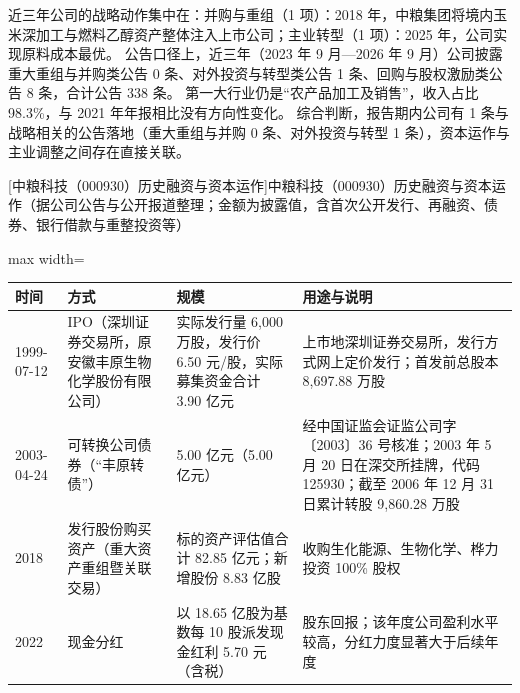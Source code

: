  近三年公司的战略动作集中在：并购与重组（1 项）：2018 年，中粮集团将境内玉米深加工与燃料乙醇资产整体注入上市公司；主业转型（1 项）：2025 年，公司实现原料成本最优。 公告口径上，近三年（2023 年 9 月---2026 年 9 月）公司披露重大重组与并购类公告 0 条、对外投资与转型类公告 1 条、回购与股权激励类公告 8 条，合计公告 338 条。 第一大行业仍是“农产品加工及销售”，收入占比 98.3\%，与 2021 年年报相比没有方向性变化。 综合判断，报告期内公司有 1 条与战略相关的公告落地（重大重组与并购 0 条、对外投资与转型 1 条），资本运作与主业调整之间存在直接关联。

\begin{center}\small\setlength{\tabcolsep}{4pt}
[中粮科技（000930）历史融资与资本运作]{中粮科技（000930）历史融资与资本运作（据公司公告与公开报道整理；金额为披露值，含首次公开发行、再融资、债券、银行借款与重整投资等）}
\begin{adjustbox}{max width=\textwidth}
\begin{tabular}{@{}p{1.45cm}p{2.55cm}p{4.05cm}p{4.95cm}@{}}
\toprule
时间 & 方式 & 规模 & 用途与说明 \\
\midrule
1999-07-12 & IPO（深圳证券交易所，原安徽丰原生物化学股份有限公司） & 实际发行量 6,\allowbreak{}000 万股，\allowbreak{}发行价 6.50 元/\allowbreak{}股，\allowbreak{}实际募集资金合计 3.90 亿元 & 上市地深圳证券交易所，\allowbreak{}发行方式网上定价发行；首发前总股本 8,\allowbreak{}697.88 万股 \\
2003-04-24 & 可转换公司债券（“丰原转债”） & 5.00 亿元（5.00 亿元） & 经中国证监会证监公司字〔2003〕36 号核准；2003 年 5 月 20 日在深交所挂牌，\allowbreak{}代码 125930；截至 2006 年 12 月 31 日累计转股 9,\allowbreak{}860.28 万股 \\
2018 & 发行股份购买资产（重大资产重组暨关联交易） & 标的资产评估值合计 82.85 亿元；新增股份 8.83 亿股 & 收购生化能源、\allowbreak{}生物化学、\allowbreak{}桦力投资 100\% 股权 \\
2022 & 现金分红 & 以 18.65 亿股为基数每 10 股派发现金红利 5.70 元（含税） & 股东回报；该年度公司盈利水平较高，\allowbreak{}分红力度显著大于后续年度 \\
\bottomrule
\end{tabular}
\end{adjustbox}
\end{center}

